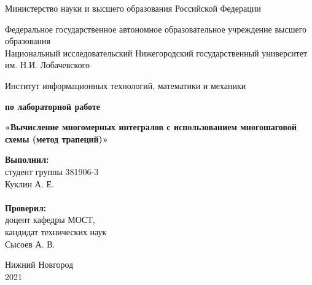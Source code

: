 \documentclass{report}
\begin{document}
\begin{titlepage}

\begin{center}
Министерство науки и высшего образования Российской Федерации
\end{center}

\begin{center}
Федеральное государственное автономное образовательное учреждение высшего образования \\
Национальный исследовательский Нижегородский государственный университет им. Н.И. Лобачевского
\end{center}

\begin{center}
Институт информационных технологий, математики и механики
\end{center}

\vspace{4em}

\begin{center}
\textbf{ по лабораторной работе} \\
\end{center}
\begin{center}
\textbf{\Large«Вычисление многомерных интегралов с использованием многошаговой схемы (метод трапеций)»} \\
\end{center}

\vspace{4em}

\newbox{\lbox}
\newlength{\maxl}
\setlength{\maxl}{\wd\lbox}
\hfill\parbox{7cm}{
\hspace*{5cm}\hspace*{-5cm}\textbf{Выполнил:} \\ студент группы 381906-3 \\ Куклин А. Е.\\
\\
\hspace*{5cm}\hspace*{-5cm}\textbf{Проверил:}\\ доцент кафедры МОСТ, \\ кандидат технических наук \\ Сысоев А. В.\\
}
\vspace{\fill}

\begin{center} Нижний Новгород \\ 2021 \end{center}

\end{titlepage}
\end{document}
